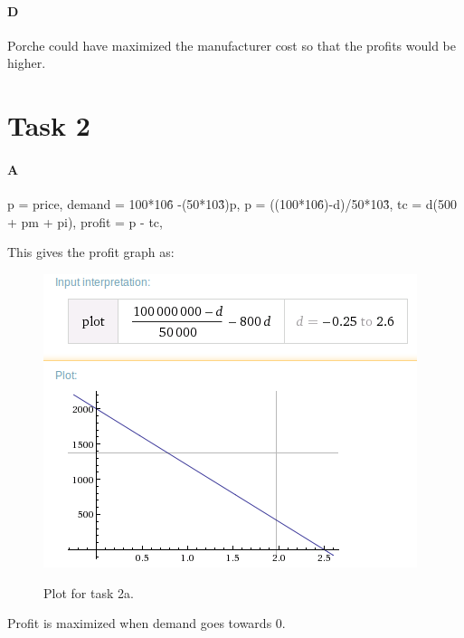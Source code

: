 \documentclass[12pt, a4paper]{article}
\begin{document}
\paragraph{D}
Porche could have maximized the manufacturer cost so that the profits would be
higher. 

\section{Task 2}
\paragraph{A}
p = price, 
demand = 100*10\^6 -(50*10\^3)p,
p = ((100*10\^6)-d)/50*10\^3,
tc = d(500 + pm + pi),
profit = p - tc,

This gives the profit graph as:
\begin{figure}[htb]
    \centering
    \includegraphics[width=\textwidth]{plot} 
    \label{plot}
    \caption{}
Plot for task 2a.
\end{figure}

Profit is maximized when demand goes towards 0. 
\end{document}
